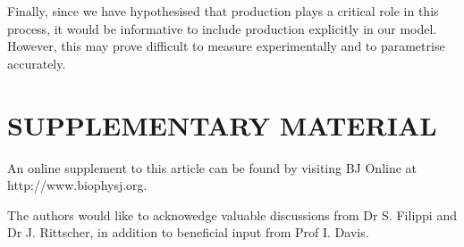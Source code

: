 \documentclass[twocolumn]{biophys}
\newcommand{\BibTeX}{\textsc{Bib}\TeX}       %
\begin{document}
Finally, since we have hypothesised that production plays a critical role in this process, it would be informative to include production explicitly in our model.
However, this may prove difficult to measure experimentally and to parametrise accurately.  

\section*{SUPPLEMENTARY MATERIAL}

An online supplement to this article can be found by visiting BJ Online at http://www.biophysj.org.

\vspace{1cm}
\footnotesize The authors would like to acknowedge valuable discussions from Dr S. Filippi and Dr J. Rittscher, in addition to beneficial input from Prof I. Davis.







%






\newpage

\listoffigures

\newpage

\listoftables


\end{document}
